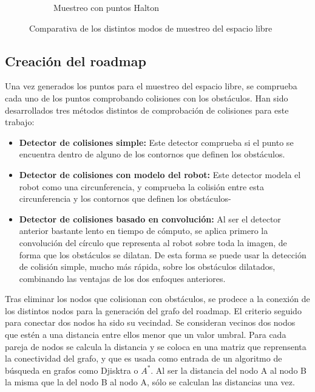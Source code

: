 \begin{figure}[b]
\begin{subfigure}[b]{0.3\textwidth}
                \caption{Muestreo con puntos Halton}
                \label{fig:muestreo_halton}
        \end{subfigure}
        \caption{Comparativa de los distintos modos de muestreo del espacio libre}\label{fig:muestreo}
\end{figure}

\subsection{Creación del roadmap}
Una vez generados los puntos para el muestreo del espacio libre, se comprueba cada uno de los puntos comprobando colisiones con los obstáculos. Han sido desarrollados tres métodos distintos de comprobación de colisiones para este trabajo:

\begin{itemize}
\item \textbf{Detector de colisiones simple: } Este detector comprueba si el punto se encuentra dentro de alguno de los contornos que definen los obstáculos.
\item \textbf{Detector de colisiones con modelo del robot: } Este detector modela el robot como una circunferencia, y comprueba la colisión entre esta circunferencia y los contornos que definen los obstáculos-
\item \textbf{Detector de colisiones basado en convolución: } Al ser el detector anterior bastante lento en tiempo de cómputo, se aplica primero la convolución del círculo que representa al robot sobre toda la imagen, de forma que los obstáculos se dilatan. De esta forma se puede usar la detección de colisión simple, mucho más rápida, sobre los obstáculos dilatados, combinando las ventajas de los dos enfoques anteriores.
\end{itemize}

Tras eliminar los nodos que colisionan con obstáculos, se prodece a la conexión de los distintos nodos para la generación del grafo del roadmap. El criterio seguido para conectar dos nodos ha sido su vecindad. Se consideran vecinos dos nodos que estén a una distancia entre ellos menor que un valor umbral. Para cada pareja de nodos se calcula la distancia y se coloca en una matriz que reprensenta la conectividad del grafo, y que es usada como entrada de un algoritmo de búsqueda en grafos como Djisktra o $A^*$. Al ser la distancia del nodo A al nodo B la misma que la del nodo B al nodo A, sólo se calculan las distancias una vez.\\

